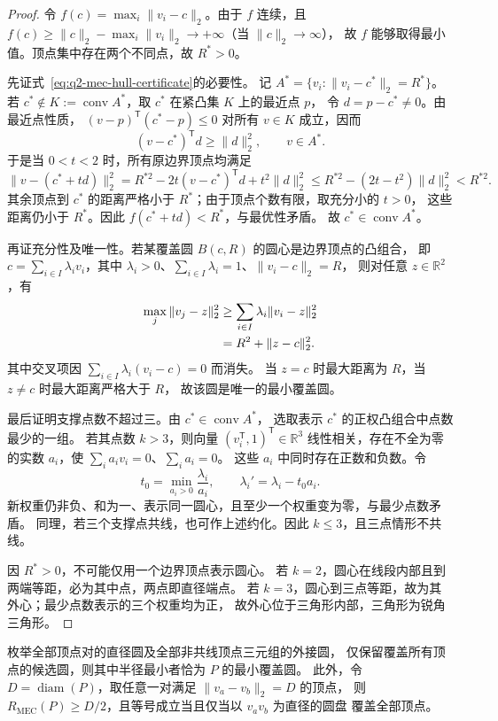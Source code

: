 \begin{proof}
令 $f(c)=\max_i\|v_i-c\|_2$。由于 $f$ 连续，且
$f(c)\ge\|c\|_2-\max_i\|v_i\|_2\to+\infty$（当 $\|c\|_2\to\infty$），
故 $f$ 能够取得最小值。顶点集中存在两个不同点，故 $R^*>0$。

先证式~\eqref{eq:q2-mec-hull-certificate}的必要性。
记 $A^*=\{v_i:\|v_i-c^*\|_2=R^*\}$。
若 $c^*\notin K:=\operatorname{conv}A^*$，取 $c^*$ 在紧凸集 $K$ 上的最近点 $p$，
令 $d=p-c^*\ne0$。由最近点性质，
$(v-p)^{\mathsf T}(c^*-p)\le0$ 对所有 $v\in K$ 成立，因而
\[
 (v-c^*)^{\mathsf T}d\ge\|d\|_2^2,\qquad v\in A^*.
\]
于是当 $0<t<2$ 时，所有原边界顶点均满足
\[
 \|v-(c^*+td)\|_2^2
 =R^{*2}-2t(v-c^*)^{\mathsf T}d+t^2\|d\|_2^2
 \le R^{*2}-(2t-t^2)\|d\|_2^2<R^{*2}.
\]
其余顶点到 $c^*$ 的距离严格小于 $R^*$；由于顶点个数有限，取充分小的 $t>0$，
这些距离仍小于 $R^*$。因此 $f(c^*+td)<R^*$，与最优性矛盾。
故 $c^*\in\operatorname{conv}A^*$。

再证充分性及唯一性。若某覆盖圆 $B(c,R)$ 的圆心是边界顶点的凸组合，
即 $c=\sum_{i\in I}\lambda_i v_i$，其中
$\lambda_i>0$、$\sum_{i\in I}\lambda_i=1$、$\|v_i-c\|_2=R$，
则对任意 $z\in\mathbb R^2$，有
\begin{align}
 \max_j\|v_j-z\|_2^2
 &\ge\sum_{i\in I}\lambda_i\|v_i-z\|_2^2 \notag\\
 &=R^2+\|z-c\|_2^2.
 \label{eq:q2-mec-certificate-identity}
\end{align}
其中交叉项因 $\sum_{i\in I}\lambda_i(v_i-c)=0$ 而消失。
当 $z=c$ 时最大距离为 $R$，当 $z\ne c$ 时最大距离严格大于 $R$，
故该圆是唯一的最小覆盖圆。

最后证明支撑点数不超过三。由 $c^*\in\operatorname{conv}A^*$，
选取表示 $c^*$ 的正权凸组合中点数最少的一组。
若其点数 $k>3$，则向量 $(v_i^{\mathsf T},1)^{\mathsf T}\in\mathbb R^3$
线性相关，存在不全为零的实数 $a_i$，使
$\sum_i a_i v_i=0$、$\sum_i a_i=0$。
这些 $a_i$ 中同时存在正数和负数。令
\[
 t_0=\min_{a_i>0}\frac{\lambda_i}{a_i},\qquad
 \lambda_i'=\lambda_i-t_0a_i.
\]
新权重仍非负、和为一、表示同一圆心，且至少一个权重变为零，与最少点数矛盾。
同理，若三个支撑点共线，也可作上述约化。因此 $k\le3$，且三点情形不共线。

因 $R^*>0$，不可能仅用一个边界顶点表示圆心。
若 $k=2$，圆心在线段内部且到两端等距，必为其中点，两点即直径端点。
若 $k=3$，圆心到三点等距，故为其外心；最少点数表示的三个权重均为正，
故外心位于三角形内部，三角形为锐角三角形。
\end{proof}

\begin{meccorollary}[有限枚举算法的正确性与直径圆判定]
\label{cor:q2-mec-enumeration}
枚举全部顶点对的直径圆及全部非共线顶点三元组的外接圆，
仅保留覆盖所有顶点的候选圆，则其中半径最小者恰为 $P$ 的最小覆盖圆。
此外，令 $D=\operatorname{diam}(P)$，取任意一对满足 $\|v_a-v_b\|_2=D$ 的顶点，
则 $R_{\mathrm{MEC}}(P)\ge D/2$，且等号成立当且仅当以 $v_av_b$ 为直径的圆盘
覆盖全部顶点。
\end{meccorollary}

